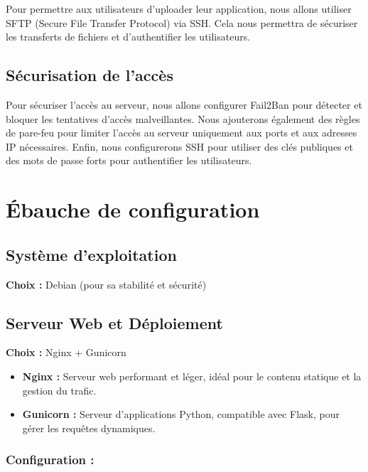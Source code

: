 Pour permettre aux utilisateurs d'uploader leur application, nous allons utiliser SFTP (Secure File Transfer Protocol) via SSH. Cela nous permettra de sécuriser les transferts de fichiers et d'authentifier les utilisateurs.

\subsection{Sécurisation de l'accès}

Pour sécuriser l'accès au serveur, nous allons configurer Fail2Ban pour détecter et bloquer les tentatives d'accès malveillantes. Nous ajouterons également des règles de pare-feu pour limiter l'accès au serveur uniquement aux ports et aux adresses IP nécessaires. Enfin, nous configurerons SSH pour utiliser des clés publiques et des mots de passe forts pour authentifier les utilisateurs.

\section{Ébauche de configuration}

\subsection{Système d'exploitation}

\textbf{Choix :} Debian (pour sa stabilité et sécurité)

\subsection{Serveur Web et Déploiement}

\textbf{Choix :} Nginx + Gunicorn

\begin{itemize}
	\item \textbf{Nginx :} Serveur web performant et léger, idéal pour le contenu statique et la gestion du trafic.
	\item \textbf{Gunicorn :} Serveur d'applications Python, compatible avec Flask, pour gérer les requêtes dynamiques.
\end{itemize}

\subsubsection*{Configuration :}

